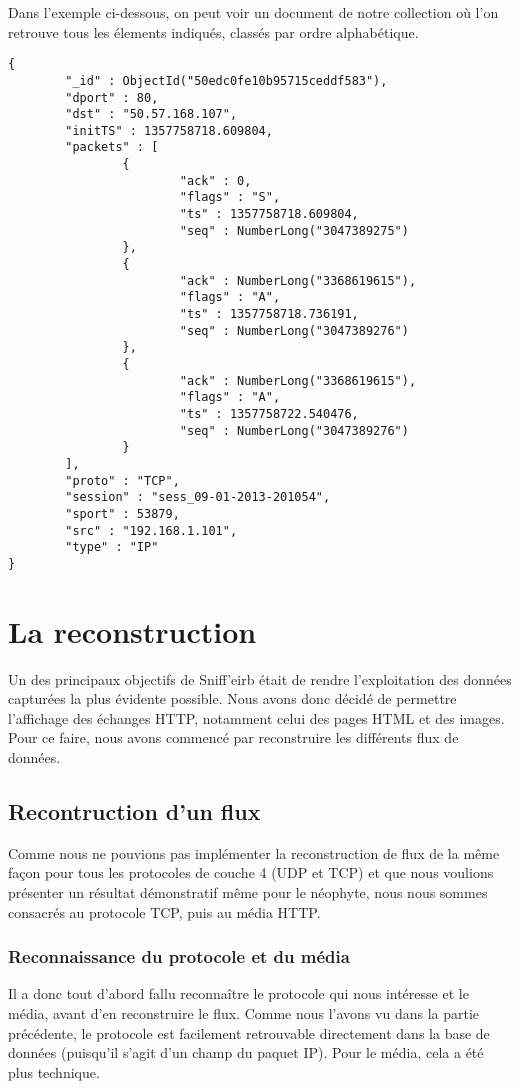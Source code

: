 Dans l'exemple ci-dessous, on peut voir un document de notre collection où l'on retrouve tous les élements indiqués, classés par ordre alphabétique.

\begin{verbatim}
{
        "_id" : ObjectId("50edc0fe10b95715ceddf583"),
        "dport" : 80,
        "dst" : "50.57.168.107",
        "initTS" : 1357758718.609804,
        "packets" : [
                {
                        "ack" : 0,
                        "flags" : "S",
                        "ts" : 1357758718.609804,
                        "seq" : NumberLong("3047389275")
                },
                {
                        "ack" : NumberLong("3368619615"),
                        "flags" : "A",
                        "ts" : 1357758718.736191,
                        "seq" : NumberLong("3047389276")
                },
                {
                        "ack" : NumberLong("3368619615"),
                        "flags" : "A",
                        "ts" : 1357758722.540476,
                        "seq" : NumberLong("3047389276")
                }
        ],
        "proto" : "TCP",
        "session" : "sess_09-01-2013-201054",
        "sport" : 53879,
        "src" : "192.168.1.101",
        "type" : "IP"
}

\end{verbatim}

\section{La reconstruction}

Un des principaux objectifs de Sniff'eirb était de rendre l'exploitation des données capturées la plus évidente possible.
Nous avons donc décidé de permettre l'affichage des échanges HTTP, notamment celui des pages HTML et des images. Pour ce
faire, nous avons commencé par reconstruire les différents flux de données.

\subsection{Recontruction d'un flux}

Comme nous ne pouvions pas implémenter la reconstruction de flux de la même façon pour tous les protocoles de couche 4 (UDP et TCP) et
que nous voulions présenter un résultat démonstratif même pour le néophyte, nous nous sommes consacrés au protocole TCP, puis au média HTTP.


\subsubsection {Reconnaissance du protocole et du média}
Il a donc tout d'abord fallu reconnaître le protocole qui nous intéresse et le média, avant d'en reconstruire le flux. Comme nous l'avons vu 
dans la partie précédente, le protocole est facilement retrouvable directement dans la base de données (puisqu'il s'agit d'un champ du paquet IP). 
Pour le média, cela a été plus technique. 

